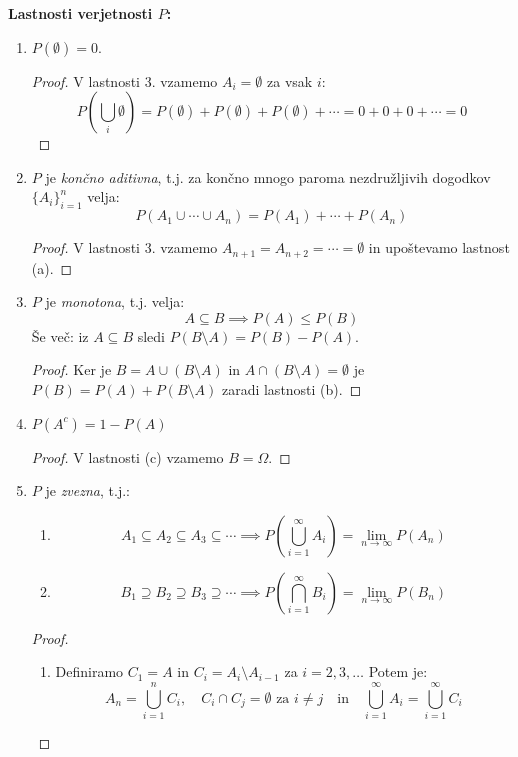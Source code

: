 \documentclass[12pt]{book}
\def\n{\noindent}
\theoremstyle{definition}
\theoremstyle{plain}
\theoremstyle{plain}
\theoremstyle{plain}
\theoremstyle{remark}
\begin{document}
\n \textbf{Lastnosti verjetnosti $P$:}

\begin{enumerate}[label=(\alph*)]
    \item $P(\emptyset) = 0$. 
    \begin{proof}
        V lastnosti 3. vzamemo $A_i = \emptyset$ za vsak $i$: 
        $$
        P\left(\bigcup_i \emptyset\right)=P(\emptyset)+P(\emptyset)+P(\emptyset)+\cdots = 0+0+0+ \cdots = 0
        $$
    \end{proof}
    \item $P$ je \emph{končno aditivna}, t.j. za končno mnogo paroma nezdružljivih dogodkov $\{A_i\}_{i=1}^{n}$ velja: 
    $$
    P\left(A_1 \cup \cdots \cup A_n\right)=P\left(A_1\right)+\cdots+P\left(A_n\right)
    $$
    \begin{proof}
        V lastnosti 3. vzamemo $A_{n+1}=A_{n+2}=\cdots=\emptyset$ in upoštevamo lastnost (a). 
    \end{proof}
    \item $P$ je \emph{monotona}, t.j. velja: 
    $$
    A \subseteq B \implies P(A) \leq P(B)
    $$ 
    Še več: iz $A \subseteq B$  sledi $P(B \setminus A)=P(B)-P(A)$.
    \begin{proof}
        Ker je $B=A \cup(B \setminus A)$ in $A \cap(B \setminus A)=\emptyset$ je $P(B)=P(A)+P(B \setminus A)$ zaradi lastnosti (b).
    \end{proof}
    \item $P(A^c) = 1-P(A)$
    \begin{proof}
        V lastnosti (c) vzamemo $B = \Omega$.
    \end{proof}
    \item $P$ je \emph{zvezna}, t.j.:
    
    \begin{enumerate}[label=(\roman*)]
        \item $$ A_1 \subseteq A_2 \subseteq A_3 \subseteq \cdots \implies P\left(\bigcup_{i=1}^{\infty} A_i\right)=\lim _{n \to \infty} P\left(A_n\right)$$
        \item $$ B_1 \supseteq B_2 \supseteq B_3 \supseteq \cdots \implies P\left(\bigcap_{i=1}^{\infty} B_i\right)=\lim _{n \to \infty} P\left(B_n\right)$$
    \end{enumerate}

    \begin{proof} 
        ~

        \begin{enumerate}[label=(\roman*)]
            \item Definiramo $C_1 = A$ in $C_i = A_i \setminus A_{i-1}$ za $i = 2, 3, \ldots$ Potem je:
            $$
            A_n=\bigcup_{i=1}^n C_i, \quad C_i \cap C_j=\emptyset \text{ za } i \neq j \quad \text{in} \quad \bigcup_{i=1}^{\infty} A_i=\bigcup_{i=1}^{\infty} C_i
            $$ 
            

\end{enumerate}
\end{proof}
\end{enumerate}
\end{document}
